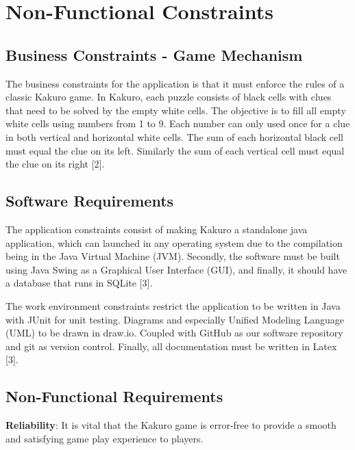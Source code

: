 \documentclass[12pt]{article}
\begin{document}
\newpage

\section{Non-Functional Constraints}

\subsection{Business Constraints - Game Mechanism}

The business constraints for the application is that it must enforce the rules of a classic Kakuro game. In Kakuro, each puzzle consists of black cells with clues that need to be solved by the empty white cells. The objective is to fill all empty white cells using numbers from 1 to 9. Each number can only used once for a clue in both vertical and horizontal white cells. The sum of each horizontal black cell must equal the clue on its left. Similarly the sum of each vertical cell must equal the clue on its right [2].

\subsection{Software Requirements}
The application constraints consist of making Kakuro a standalone java application, which can launched in any operating system due to the compilation being in the Java Virtual Machine (JVM). Secondly, the software must be built using Java Swing as a Graphical User Interface (GUI), and finally, it should have a database that runs in SQLite [3].

\vspace{5mm}

The work environment constraints restrict the application to be written in Java with JUnit for unit testing. Diagrams and especially Unified Modeling Language (UML) to be drawn in draw.io. Coupled with GitHub as our software repository and git as version control. Finally, all documentation must be written in Latex [3]. 
 

\subsection{Non-Functional Requirements}
 
\textbf{Reliability}: It is vital that the Kakuro game is error-free to provide a smooth and satisfying game play experience to players.

\vspace{5mm}
\end{document}
